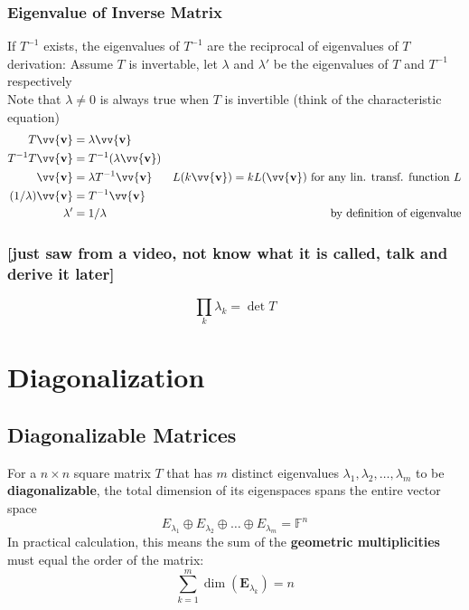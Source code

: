 \documentclass[11pt]{article}
\DeclareRobustCommand{\myvec}[1]{\vv{\mathbf{#1}}}
\newcommand{\mysubvecsp}[1]{\bm{{#1}}}
\newcommand{\mymat}[1]{#1}
\begin{document}
    \subsubsection{Eigenvalue of Inverse Matrix}
    If $\mymat{T}^{-1}$ exists, the eigenvalues of $\mymat{T}^{-1}$ are the reciprocal of eigenvalues of $\mymat{T}$\\
    derivation: Assume $\mymat{T}$ is invertable, let $\lambda$ and $\lambda'$ be the eigenvalues of $\mymat{T}$ and $\mymat{T}^{-1}$ respectively\\
    Note that $\lambda \ne 0$ is always true when $\mymat{T}$ is invertible (think of the characteristic equation)
    \begin{align*}
        \mymat{T}\myvec{v} &= \lambda\myvec{v} \\
        \mymat{T}^{-1} \mymat{T} \myvec{v} &= \mymat{T}^{-1} (\lambda \myvec{v}) \\
        \myvec{v} &= \lambda \mymat{T}^{-1} \myvec{v} & \mymat{L}(k\myvec{v}) = k\mymat{L}(\myvec{v}) \text{ for any lin. transf. function }\mymat{L}\\
        (1/\lambda)\myvec{v} &= \mymat{T}^{-1} \myvec{v}\\
        \lambda' &= 1/\lambda & \text{by definition of eigenvalue}
    \end{align*}
    \subsubsection{[just saw from a video, not know what it is called, talk and derive it later]}
    \[ \prod_{k} \lambda_k = \det \mymat{T} \]


    \newpage
    \section{Diagonalization}
    \subsection{Diagonalizable Matrices}
    For a $n \times n$ square matrix $\mymat{T}$ that has $m$ distinct eigenvalues $\lambda_1, \lambda_2, \dots, \lambda_m$ to be \textbf{diagonalizable}, the total dimension of its eigenspaces spans the entire vector space
    \begin{equation}
        \mymat{E}_{\lambda_1} \oplus \mymat{E}_{\lambda_2} \oplus \dots \oplus \mymat{E}_{\lambda_m} = \mathbb{F}^n
    \end{equation}
    In practical calculation, this means the sum of the \textbf{geometric multiplicities} must equal the order of the matrix:
    \begin{equation}
        \sum_{k=1}^{m} \dim(\mysubvecsp{E}_{\lambda_k}) = n
    \end{equation}
\end{document}
